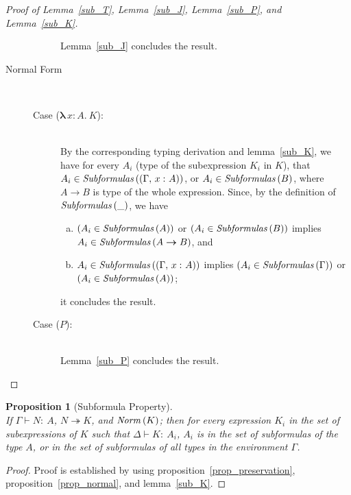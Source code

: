 \documentclass[a4paper]{article}
\newcommand{\typecolor}{}
\newcommand{\termcolor}{}
\newcommand{\tp}[1]{{\typecolor #1}}
\newcommand{\tm}[1]{{\termcolor #1}}
\newtheorem{proposition}[theorem]{Proposition}
\newcommand{\typarr}[2]{#1\boldsymbol{\rightarrow}#2}
\newcommand{\expabs}[3]{\boldsymbol{\lambda}\,#1\boldsymbol{\colon}#2\boldsymbol{.}\ #3}
\newcommand{\typing}[2]{\tm{#1:\ }\tp{#2}}
\newcommand{\typenvcon}[2]{\tp{\Gamma,}\ \typing{#1}{#2}}
\newcommand{\txt}[1]{\text{\textit{#1}}}
\newcommand{\reducestar}[3]{#1 \overset{#2}\twoheadrightarrow #3}
\newcommand{\subformulas}[1]{\txt{Subformulas}\,(#1)}
\newcommand{\norm}[1]{\txt{Norm}\,(#1)}
\begin{document}
\begin{proof}[Proof of Lemma~\ref{sub_T}, Lemma~\ref{sub_J}, Lemma~\ref{sub_P}, and Lemma~\ref{sub_K}]
\begin{description}
\begin{description}
  Lemma~\ref{sub_J} concludes the result.
\end{description}
\item[Normal Form]\ \\
\begin{description}
\item[Case ($\expabs{x}{A}{K}$):]\ \\ 
  By the corresponding typing derivation and lemma~\ref{sub_K}, we
  have for every $A_i$ (type of the subexpression $K_i$ in $K$), that
  $A_i \in \subformulas{(\typenvcon{x}{A})}$, or $A_i \in
  \subformulas{B}$, where $\typarr{A}{B}$ is type of the whole
  expression. Since, by the definition of $\subformulas{\_}$, we have
  \begin{enumerate}[(a)] 
     \item $(A_i \in \subformulas{A})$ or $(A_i \in \subformulas{B})$ implies $A_i \in \subformulas{\typarr{A}{B}}$, and
     \item $A_i \in \subformulas{(\typenvcon{x}{A})}$ implies $(A_i \in \subformulas{\Gamma})$ or $(A_i \in \subformulas{A})$;
  \end{enumerate}
  it concludes the result.
\item[Case ($P$):]\ \\
  Lemma~\ref{sub_P} concludes the result.   
\end{description}
\end{description}
\end{proof}

\begin{proposition}[Subformula Property]\ \\
\label{prop_subformula}
If $\Gamma \vdash \typing{N}{A}$, $\reducestar{N}{}{K}$, and $\norm{K}$;
then for every expression $K_i$ in the set of subexpressions of $K$ such
that $\Delta \vdash \typing{K}{A_i}$, $A_i$ is in the set of subformulas of
the type $A$, or in the set of subformulas of all types in the
environment $\Gamma$.
\end{proposition}
\begin{proof}
Proof is established by using proposition~\ref{prop_preservation},
proposition~\ref{prop_normal}, and lemma~\ref{sub_K}.
\end{proof}

\end{document}
